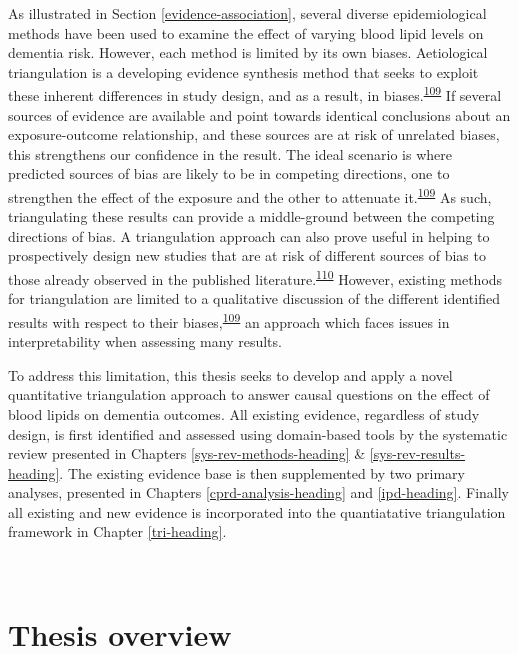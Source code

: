 \documentclass[a4paper, twoside]{templates/ociamthesis}
\begin{document}
As illustrated in Section \ref{evidence-association}, several diverse epidemiological methods have been used to examine the effect of varying blood lipid levels on dementia risk. However, each method is limited by its own biases. Aetiological triangulation is a developing evidence synthesis method that seeks to exploit these inherent differences in study design, and as a result, in biases.\textsuperscript{\protect\hyperlink{ref-lawlor2016}{109}} If several sources of evidence are available and point towards identical conclusions about an exposure-outcome relationship, and these sources are at risk of unrelated biases, this strengthens our confidence in the result. The ideal scenario is where predicted sources of bias are likely to be in competing directions, one to strengthen the effect of the exposure and the other to attenuate it.\textsuperscript{\protect\hyperlink{ref-lawlor2016}{109}} As such, triangulating these results can provide a middle-ground between the competing directions of bias. A triangulation approach can also prove useful in helping to prospectively design new studies that are at risk of different sources of bias to those already observed in the published literature.\textsuperscript{\protect\hyperlink{ref-munafo2018}{110}} However, existing methods for triangulation are limited to a qualitative discussion of the different identified results with respect to their biases,\textsuperscript{\protect\hyperlink{ref-lawlor2016}{109}} an approach which faces issues in interpretability when assessing many results.

To address this limitation, this thesis seeks to develop and apply a novel quantitative triangulation approach to answer causal questions on the effect of blood lipids on dementia outcomes. All existing evidence, regardless of study design, is first identified and assessed using domain-based tools by the systematic review presented in Chapters \ref{sys-rev-methods-heading} \& \ref{sys-rev-results-heading}. The existing evidence base is then supplemented by two primary analyses, presented in Chapters \ref{cprd-analysis-heading} and \ref{ipd-heading}. Finally all existing and new evidence is incorporated into the quantiatative triangulation framework in Chapter \ref{tri-heading}.

~

\hypertarget{background-thesis-overview}{%
\section{Thesis overview}\label{background-thesis-overview}}
\end{document}

